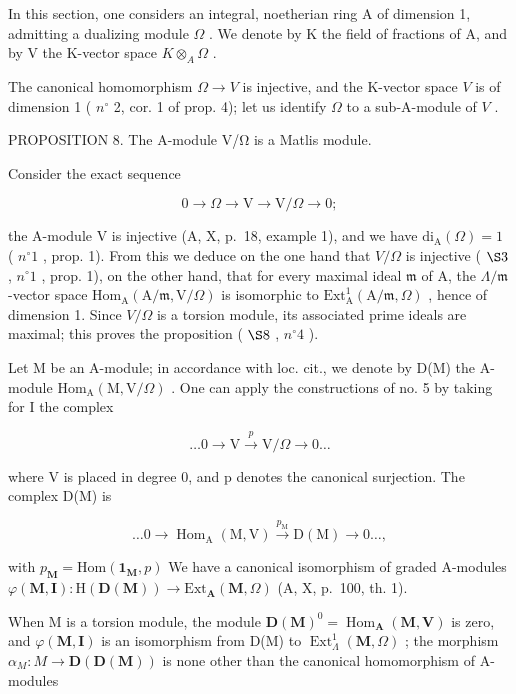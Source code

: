 In this section, one considers an integral, noetherian ring A of dimension 1, admitting a dualizing module \(\Omega\) . We denote by K the field of fractions of A, and by V the K-vector space \(K \otimes_{A} \Omega\) .

The canonical homomorphism \(\Omega\to V\) is injective, and the K-vector space \(V\) is of dimension 1 ( \(n^{\circ}\) 2, cor. 1 of prop. 4); let us identify \(\Omega\) to a sub-A-module of \(V\) .

PROPOSITION 8. The A-module V/Ω is a Matlis module.

Consider the exact sequence

\[
0 \to \Omega \to \mathrm{V} \to \mathrm{V} / \Omega \to 0;
\]

the A-module V is injective (A, X, p.~18, example 1), and we have \(\mathrm{di}_{\mathrm{A}}(\Omega) = 1\) ( \(n^{\circ} 1\) , prop. 1). From this we deduce on the one hand that \(V/\Omega\) is injective ( \(\S 3\) , \(n^{\circ} 1\) , prop. 1), on the other hand, that for every maximal ideal \(\mathfrak{m}\) of A, the \(\Lambda/\mathfrak{m}\) -vector space \(\mathrm{Hom}_{\mathrm{A}}(\mathrm{A}/\mathfrak{m}, \mathrm{V}/\Omega)\) is isomorphic to \(\mathrm{Ext}_{\mathrm{A}}^{1}(\mathrm{A}/\mathfrak{m}, \Omega)\) , hence of dimension 1. Since \(V/\Omega\) is a torsion module, its associated prime ideals are maximal; this proves the proposition ( \(\S 8\) , \(n^{\circ} 4\) ).

Let M be an A-module; in accordance with loc. cit., we denote by D(M) the A-module \(\mathrm{Hom}_{\mathrm{A}}(\mathrm{M},\mathrm{V}/\Omega)\) . One can apply the constructions of no. 5 by taking for I the complex

\[
\dots 0 \longrightarrow \mathrm{V} \xrightarrow {p} \mathrm{V} / \Omega \longrightarrow 0 \dots
\]

where V is placed in degree 0, and p denotes the canonical surjection. The complex D(M) is

\[
\dots 0 \longrightarrow \operatorname{Hom} _ {\mathrm{A}} (\mathrm{M}, \mathrm{V}) \xrightarrow {p _ {\mathrm{M}}} \mathrm{D} (\mathrm{M}) \longrightarrow 0 \dots ,
\]

with \(p_{\mathbf{M}} = \mathrm{Hom}(\mathbf{1}_{\mathbf{M}}, p)\) We have a canonical isomorphism of graded A-modules \(\varphi(\mathbf{M}, \mathbf{I}) : \mathrm{H}(\mathbf{D}(\mathbf{M})) \longrightarrow \mathrm{Ext}_{\mathbf{A}}(\mathbf{M}, \Omega)\) (A, X, p.~100, th. 1).

When M is a torsion module, the module \(\mathbf{D}(\mathbf{M})^{0} = \operatorname{Hom}_{\mathbf{A}}(\mathbf{M}, \mathbf{V})\) is zero, and \(\varphi(\mathbf{M}, \mathbf{I})\) is an isomorphism from D(M) to \(\operatorname{Ext}_{\Lambda}^{1}(\mathbf{M}, \Omega)\) ; the morphism \(\alpha_{M}: M \to \mathbf{D}(\mathbf{D}(\mathbf{M}))\) is none other than the canonical homomorphism of A-modules

